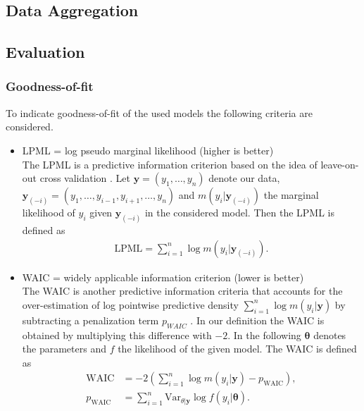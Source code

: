 \documentclass[12pt,a4paper]{article}
\begin{document}
\subsection{Data Aggregation}

\subsection{Evaluation}

\subsubsection{Goodness-of-fit}
To indicate goodness-of-fit of the used models the following criteria are considered. \medskip

\begin{itemize}
    \item LPML = log pseudo marginal likelihood (higher is better)\\
    The LPML is a predictive information criterion based on the idea of leave-on-out cross validation \cite{lecturenotes}. Let $\mathbf{y} = (y_1, \dots , y_n )$ denote our data, $\mathbf{y}_{(-i)} = (y_1, \dots , y_{i-1}, y_{i+1}, \dots, y_n )$ and $m(y_i | \mathbf{y}_{(-i)}) $ the marginal likelihood of $y_i$ given $\mathbf{y}_{(-i)}$ in the considered model. Then the LPML is defined as
    \begin{align*}
        \text{LPML} = \sum_{i=1}^n \log m(y_i | \mathbf{y}_{(-i)}).
    \end{align*}
    
    \item WAIC = widely applicable information criterion (lower is better)\\
    The WAIC is another predictive information criteria that accounts for the over-estimation of log pointwise predictive density $\sum_{i=1}^n \log m(y_i | \mathbf{y})$ by subtracting a penalization term $p_{WAIC}$ \cite{lecturenotes}. In our definition the WAIC is obtained by multiplying this difference with $-2$. In the following $\mathbf{\theta}$ denotes the parameters and $f$ the likelihood of the given model. The WAIC is defined as
    \begin{align*}
        \text{WAIC} &= -2 \left( \sum_{i=1}^n \log m(y_i | \mathbf{y} ) - 
        p_{\text{WAIC}} \right), \\
        p_{\text{WAIC}} &= \sum_{i=1}^n \text{Var}_{\theta | \mathbf{y}} \log 
        f(y_i | \mathbf{\theta} ).
    \end{align*}


\end{itemize}
\end{document}
